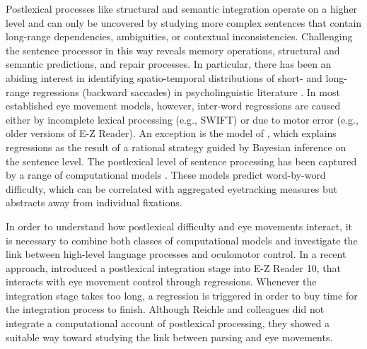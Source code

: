 Postlexical processes  like structural and semantic integration operate on a higher level and can only be uncovered by studying more complex sentences that contain long-range dependencies, ambiguities, or contextual inconsistencies.  Challenging the sentence processor in this way reveals memory operations, structural and semantic predictions, and repair processes.
In particular, there has been an abiding interest in identifying spatio-temporal distributions of short- and long-range regressions (backward saccades) in psycholinguistic literature \cite{vanDyke2003,Frazier1982a,MalsburgVasishth2011,MalsburgVasishth2012,Meseguer2002,MitchellEtAl2008,Weger2007}. 
In most established eye movement models, however, inter-word regressions are caused either by incomplete lexical processing (e.g., SWIFT) or due to motor error (e.g., older versions of E-Z Reader).  An exception is the model of \cite{BicknellLevy2010a}, which explains regressions as the result of a rational strategy guided by Bayesian inference on the sentence level. 
The postlexical level of sentence processing has been captured by a range of computational models \citep{Binder2001,Elman:2005p2,Hale2011,JustCarpenter1992,Konieczny2003,Budiu2004,LewisVasishth2005,MacDonaldChristiansen2002,SpiveyTanenhaus1998,VasishthBruessowLewis2008}.  These models predict word-by-word difficulty, which can be correlated with aggregated eyetracking measures but abstracts away from individual fixations.

In order to understand how postlexical difficulty and eye movements interact, it is necessary to combine both classes of computational models and investigate the link between high-level language processes and oculomotor control.  In a recent approach, \cite{ReichleWarrenMcConnell2009} introduced a postlexical integration stage into E-Z Reader 10, that interacts with eye movement control through regressions.  Whenever the integration stage takes too long, a regression is triggered in order to buy time for the integration process to finish.  Although Reichle and colleagues did not integrate a computational account of postlexical processing, they showed a suitable way toward studying the link between parsing and eye movements.

